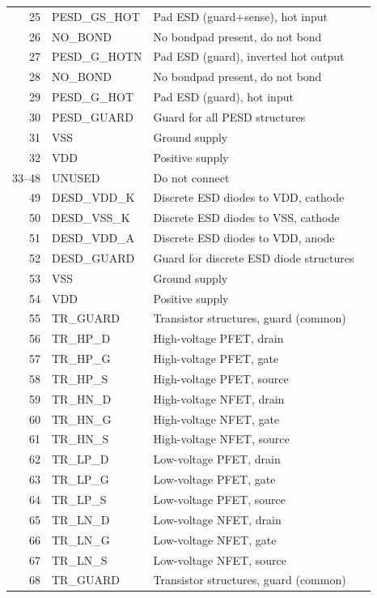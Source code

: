 \documentclass{cernatsnote}
\begin{document}
\begin{longtable}{r l l l}
25 & PESD\_GS\_HOT    & Pad ESD (guard+sense), hot input\\
26 & NO\_BOND        & No bondpad present, do not bond\\
27 & PESD\_G\_HOTN    & Pad ESD (guard), inverted hot output\\
28 & NO\_BOND        & No bondpad present, do not bond\\
29 & PESD\_G\_HOT     & Pad ESD (guard), hot input\\
30 & PESD\_GUARD     & Guard for all PESD structures\\
31 & VSS             & Ground supply\\
32 & VDD             & Positive supply\\
33--48 & UNUSED       & Do not connect\\
49 & DESD\_VDD\_K     & Discrete ESD diodes to VDD, cathode\\
50 & DESD\_VSS\_K     & Discrete ESD diodes to VSS, cathode\\
51 & DESD\_VDD\_A     & Discrete ESD diodes to VDD, anode\\
52 & DESD\_GUARD     & Guard for discrete ESD diode structures\\
53 & VSS             & Ground supply\\
54 & VDD             & Positive supply\\
55 & TR\_GUARD       & Transistor structures, guard (common)\\
56 & TR\_HP\_D       & High-voltage PFET, drain\\
57 & TR\_HP\_G       & High-voltage PFET, gate\\
58 & TR\_HP\_S       & High-voltage PFET, source\\
59 & TR\_HN\_D       & High-voltage NFET, drain\\
60 & TR\_HN\_G       & High-voltage NFET, gate\\
61 & TR\_HN\_S       & High-voltage NFET, source\\
62 & TR\_LP\_D       & Low-voltage PFET, drain\\
63 & TR\_LP\_G       & Low-voltage PFET, gate\\
64 & TR\_LP\_S       & Low-voltage PFET, source\\
65 & TR\_LN\_D       & Low-voltage NFET, drain\\
66 & TR\_LN\_G       & Low-voltage NFET, gate\\
67 & TR\_LN\_S       & Low-voltage NFET, source\\
68 & TR\_GUARD       & Transistor structures, guard (common)\\

\end{longtable}
\end{document}
